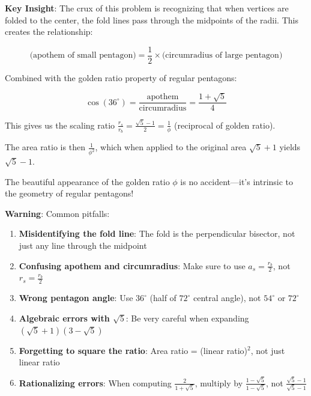 \documentclass[12pt]{article}
\begin{document}
\begin{keyinsightbox}
\textbf{Key Insight}: The crux of this problem is recognizing that when vertices are folded to the center, the fold lines pass through the midpoints of the radii. This creates the relationship:

$$\text{(apothem of small pentagon)} = \frac{1}{2} \times \text{(circumradius of large pentagon)}$$

Combined with the golden ratio property of regular pentagons:

$$\cos(36^\circ) = \frac{\text{apothem}}{\text{circumradius}} = \frac{1+\sqrt{5}}{4}$$

This gives us the scaling ratio $\frac{r_s}{r_b} = \frac{\sqrt{5}-1}{2} = \frac{1}{\phi}$ (reciprocal of golden ratio).

The area ratio is then $\frac{1}{\phi^2}$, which when applied to the original area $\sqrt{5}+1$ yields $\sqrt{5}-1$.

The beautiful appearance of the golden ratio $\phi$ is no accident—it's intrinsic to the geometry of regular pentagons!
\end{keyinsightbox}

\begin{warningbox}
\textbf{Warning}: Common pitfalls:
\begin{enumerate}
    \item \textbf{Misidentifying the fold line}: The fold is the perpendicular bisector, not just any line through the midpoint
    \item \textbf{Confusing apothem and circumradius}: Make sure to use $a_s = \frac{r_b}{2}$, not $r_s = \frac{r_b}{2}$
    \item \textbf{Wrong pentagon angle}: Use $36^\circ$ (half of $72^\circ$ central angle), not $54^\circ$ or $72^\circ$
    \item \textbf{Algebraic errors with $\sqrt{5}$}: Be very careful when expanding $(\sqrt{5}+1)(3-\sqrt{5})$
    \item \textbf{Forgetting to square the ratio}: Area ratio = (linear ratio)$^2$, not just linear ratio
    \item \textbf{Rationalizing errors}: When computing $\frac{2}{1+\sqrt{5}}$, multiply by $\frac{1-\sqrt{5}}{1-\sqrt{5}}$, not $\frac{\sqrt{5}-1}{\sqrt{5}-1}$
\end{enumerate}
\end{warningbox}
\end{document}

